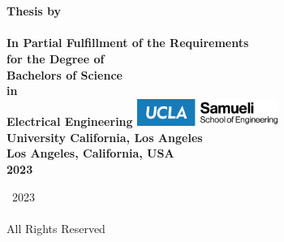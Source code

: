 

\thispagestyle{empty}

\begingroup
\centering
{}
~
\\[1em]
\sffamily\bfseries\fontsize{26}{31.2}\selectfont
\DocumentTitle
\\[0.4in]
\normalfont\large
Thesis by
\\[0.25em]
\sffamily\bfseries\Large
\AuthorName
\\[0.4in]
\normalfont\normalsize
In Partial Fulfillment of the Requirements
\\[0.5em]
for the Degree of
\\[0.5em]
Bachelors of Science
\\[0.5em]
in
\\[0.5em]
Electrical Engineering 
\vfill
\includegraphics[width=1.8in]
{Figures/UCLA_logo.png}
\\[1.5em]
University California, Los Angeles
\\[0.5em]
Los Angeles, California, USA
\\[1.5em]
2023
\\[0.5em]
\par
\endgroup

\clearpage


\pagestyle{plain}
\setcounter{page}{2}

\begingroup
\centering
{}
\null
\vfill
{\sffamily\textcopyright}~2023
\\[0.5em]
\AuthorName
\\[0.5em]
All Rights Reserved
\par
\endgroup

\clearpage


